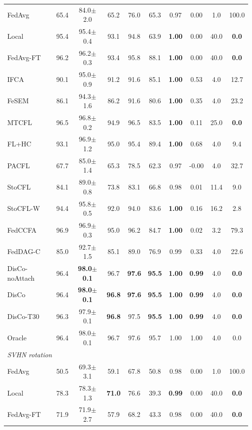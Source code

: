 \begin{tabular}{lccccccccc}
FedAvg & 65.4 & 84.0$\pm$2.0 & 65.2 & 76.0 & 65.3 & 0.97 & 0.00 & 1.0 & 100.0 \\
Local & 95.4 & 95.4$\pm$0.4 & 93.1 & 94.8 & 63.9 & \textbf{1.00} & 0.00 & 40.0 & \textbf{0.0} \\
FedAvg-FT & 96.2 & 96.2$\pm$0.3 & 93.4 & 95.8 & 88.1 & \textbf{1.00} & 0.00 & 40.0 & \textbf{0.0} \\
IFCA & 90.1 & 95.0$\pm$0.9 & 91.2 & 91.6 & 85.1 & \textbf{1.00} & 0.53 & 4.0 & 12.7 \\
FeSEM & 86.1 & 94.3$\pm$1.6 & 86.2 & 91.6 & 80.6 & \textbf{1.00} & 0.35 & 4.0 & 23.2 \\
MTCFL & 96.5 & 96.8$\pm$0.2 & 94.9 & 96.5 & 83.5 & \textbf{1.00} & 0.11 & 25.0 & \textbf{0.0} \\
FL+HC & 93.1 & 96.9$\pm$1.2 & 95.0 & 95.4 & 89.4 & \textbf{1.00} & 0.68 & 4.0 & 9.4 \\
PACFL & 67.7 & 85.0$\pm$1.4 & 65.3 & 78.5 & 62.3 & 0.97 & -0.00 & 4.0 & 32.7 \\
StoCFL & 84.1 & 89.0$\pm$0.8 & 73.8 & 83.1 & 66.8 & 0.98 & 0.01 & 11.4 & 9.0 \\
StoCFL-W & 94.4 & 95.8$\pm$0.5 & 92.0 & 94.0 & 83.6 & \textbf{1.00} & 0.16 & 16.2 & 2.8 \\
FedCCFA & 96.9 & 96.9$\pm$0.3 & 95.0 & 96.2 & 84.7 & \textbf{1.00} & 0.02 & 3.2 & 79.3 \\
FedDAG-C & 85.0 & 92.7$\pm$1.5 & 85.1 & 89.0 & 76.9 & 0.99 & 0.33 & 4.0 & 22.6 \\
DisCo-noAttach & 96.4 & \textbf{98.0$\pm$0.1} & 96.7 & \textbf{97.6} & \textbf{95.5} & \textbf{1.00} & \textbf{0.99} & 4.0 & \textbf{0.0} \\
DisCo & 96.4 & \textbf{98.0$\pm$0.1} & \textbf{96.8} & \textbf{97.6} & \textbf{95.5} & \textbf{1.00} & \textbf{0.99} & 4.0 & \textbf{0.0} \\
DisCo-T30 & 96.3 & 97.9$\pm$0.1 & \textbf{96.8} & 97.5 & \textbf{95.5} & \textbf{1.00} & \textbf{0.99} & 4.0 & \textbf{0.0} \\
Oracle & 96.4 & 98.0$\pm$0.1 & 96.7 & 97.6 & 95.7 & 1.00 & 1.00 & 4.0 & 0.0 \\
\midrule
\multicolumn{10}{l}{\textit{SVHN rotation}}\\
FedAvg & 50.5 & 69.3$\pm$3.1 & 59.1 & 67.8 & 50.8 & 0.98 & 0.00 & 1.0 & 100.0 \\
Local & 78.3 & 78.3$\pm$1.3 & \textbf{71.0} & 76.6 & 39.3 & \textbf{0.99} & 0.00 & 40.0 & \textbf{0.0} \\
FedAvg-FT & 71.9 & 71.9$\pm$2.7 & 57.9 & 68.2 & 43.3 & 0.98 & 0.00 & 40.0 & \textbf{0.0} \\

\end{tabular}
